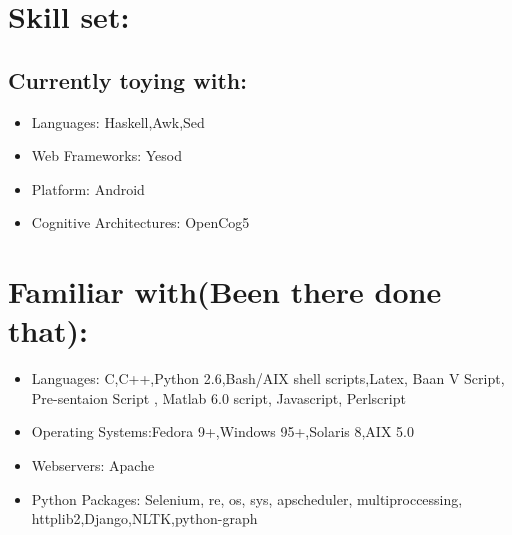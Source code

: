 \section {Skill set:}
	\subsection {Currently toying with:}
		\begin{itemize}
			\item Languages: Haskell,Awk,Sed

	 		\item Web Frameworks: Yesod

			\item Platform: Android

	 		\item Cognitive Architectures: OpenCog5
		\end{itemize}

\section {Familiar with(Been there done that):}
	\begin{itemize}

		\item Languages: C,C++,Python 2.6,Bash/AIX shell scripts,Latex, Baan V Script, Pre-sentaion Script , Matlab 6.0 script, Javascript, Perlscript

		\item Operating Systems:Fedora 9+,Windows 95+,Solaris 8,AIX 5.0

		\item Webservers: Apache

		\item Python Packages: Selenium, re, os, sys, apscheduler, multiproccessing, httplib2,Django,NLTK,python-graph
	\end{itemize}
